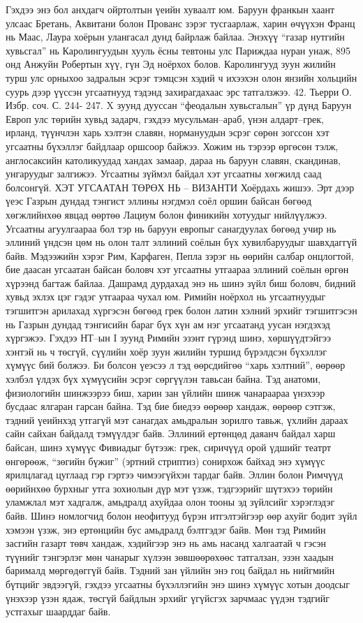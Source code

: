 Гэхдээ энэ бол анхдагч ойртолтын үеийн хуваалт юм. Баруун франкын хаант улсаас Бретань, Аквитани болон Прованс зэрэг тусгаарлаж, харин өчүүхэн Франц нь Маас, Лаура хоёрын улангасал дунд байрлаж байлаа. Энэхүү “газар нутгийн хувьсгал” нь Каролингуудын хууль ёсны тевтоны улс Париждаа нуран унаж, 895 онд Анжуйн Робертын хүү, гүн Эд ноёрхох болов. Каролингууд зуун жилийн турш улс орныхоо задралын эсрэг тэмцсэн хэдий ч ихээхэн олон янзийн хольцийн суурь дээр үүссэн угсаатнууд тэдэнд захирагдахаас эрс татгалзжээ. 42. Тьерри О. Избр. соч. С. 244- 247.
X зуунд дууссан “феодалын хувьсгалын” үр дүнд Баруун Европ улс төрийн хувьд задарч, гэхдээ мусульман–араб, үнэн алдарт–грек, ирланд, түүнчлэн харь хэлтэн славян, нормануудын эсрэг сөрөн зогссон хэт угсаатны бүхэллэг байдлаар оршсоор байжээ. Хожим нь тэрээр өргөсөн тэлж, англосаксийн католикуудад хандах замаар, дараа нь баруун славян, скандинав, унгаруудыг залгижээ. Угсаатны зүймэл байдал хэт угсаатны хөгжилд саад болсонгүй.
ХЭТ УГСААТАН ТӨРӨХ НЬ – ВИЗАНТИ
Хоёрдахь жишээ. Эрт дээр үеэс Газрын дундад тэнгист эллины нэгдмэл соёл оршин байсан бөгөөд хөгжлийнхөө явцад өөртөө Лациум болон финикийн хотуудыг нийлүүлжээ. Угсаатны агуулгаараа бол тэр нь баруун европыг санагдуулах бөгөөд учир нь эллиний үндсэн цөм нь олон талт эллиний соёлын бүх хувилбаруудыг шавхдаггүй байв. Мэдээжийн хэрэг Рим, Карфаген, Пепла зэрэг нь өөрийн салбар онцлогтой, бие даасан угсаатан байсан боловч хэт угсаатны утгаараа эллиний соёлын өргөн хүрээнд багтаж байлаа. Дашрамд дурдахад энэ нь шинэ зүйл биш боловч, бидний хувьд эхлэх цэг гэдэг утгаараа чухал юм. Римийн ноёрхол нь угсаатнуудыг тэгшитгэн арилахад хүргэсэн бөгөөд грек болон латин хэлний эрхийг тэгшитгэсэн нь Газрын дундад тэнгисийн бараг бүх хүн ам нэг угсаатанд уусан нэгдэхэд хүргэжээ.
Гэхдээ НТ–ын I зуунд Римийн эзэнт гүрэнд шинэ, хөршүүдтэйгээ хэнтэй нь ч төсгүй, сүүлийн хоёр зуун жилийн туршид бүрэлдсэн бүхэллэг хүмүүс бий болжээ. Би болсон үеэсээ л тэд өөрсдийгөө “харь хэлтний”, өөрөөр хэлбэл үлдэх бүх хүмүүсийн эсрэг сөргүүлэн тавьсан байна. Тэд анатоми, физиологийн шинжээрээ биш, харин зан үйлийн шинж чанараараа үнэхээр бусдаас ялгаран гарсан байна. Тэд бие биедээ өөрөөр хандаж, өөрөөр сэтгэж, тэдний үеийнхэд утгагүй мэт санагдах амьдралын зорилго тавьж, үхлийн дараах сайн сайхан байдалд тэмүүлдэг байв. Эллиний ертөнцөд даяанч байдал харш байсан, шинэ хүмүүс Фивиадыг бүтээж: грек, сиричүүд орой үдшийг театрт өнгөрөөж, “зөгийн бүжиг” (эртний стриптиз) сонирхож байхад энэ хүмүүс ярилцлагад цуглаад гэр гэртээ чимээгүйхэн тардаг байв. Эллин болон Римчүүд өөрийнхөө бурхныг утга зохиолын дүр мэт үзэж, тэдгээрийг шүтэхээ төрийн уламжлал мэт хадгалж, амьдралд ахуйдаа олон тооны эд зүйлсийг хэрэглэдэг байв. Шинэ номлогчид болон неофитууд бүрэн итгэлтэйгээр өөр ахуйг бодит зүйл хэмээн үзэж, энэ ертөнцийн бус амьдралд бэлтгэдэг байв. Мөн тэд Римийн засгийн газарт төвч хандаж, хэдийгээр энэ нь амь насанд халгаатай ч гэсэн түүнийг тэнгэрлэг мөн чанарыг хүлээн зөвшөөрөхөөс татгалзан, эзэн хаадын барималд мөргөдөггүй байв. Тэдний зан үйлийн энэ гоц байдал нь нийгмийн бүтцийг эвдээгүй, гэхдээ угсаатны бүхэллэгийн энэ шинэ хүмүүс хотын доодсыг үнэхээр үзэн ядаж, төсгүй байдлын эрхийг үгүйсгэх зарчмаас үүдэн тэдгийг устгахыг шаарддаг байв.
